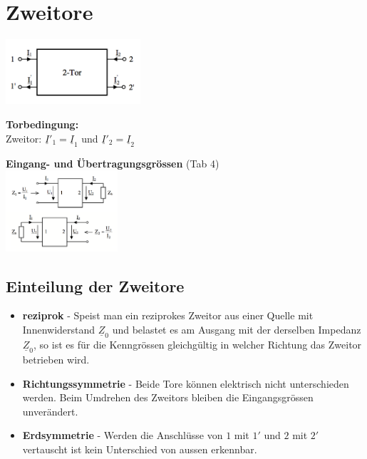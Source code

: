 \section{Zweitore}
	\begin{minipage}{5.5cm}
		\includegraphics[width = 5cm]{./bilder/zweitor}
	\end{minipage}
	\begin{minipage}{5.5cm}
		\textbf{Torbedingung:}\\
		Zweitor: $\underline{I}'_1 = \underline{I}_1$ und $\underline{I}'_2 = \underline{I}_2$
	\end{minipage}
	\begin{minipage}{7.5cm}
		\textbf{Eingang- und Übertragungsgrössen} (Tab 4)\\
		\hspace*{1.5cm}\includegraphics[height = 3cm]{./bilder/Zweitor_EingImp_UebGroe}
	\end{minipage}

\subsection{Einteilung der Zweitore}
	\begin{itemize}
	 \item \textbf{reziprok} - Speist man ein reziprokes Zweitor aus einer Quelle mit Innenwiderstand $\underline{Z}_0$ und belastet es am Ausgang mit der derselben Impedanz $\underline{Z}_0$, so ist es für die Kenngrössen gleichgültig in welcher Richtung das Zweitor betrieben wird.
	 \item \textbf{Richtungssymmetrie} - Beide Tore können elektrisch nicht unterschieden werden. Beim Umdrehen des Zweitors bleiben die Eingangsgrössen unverändert.
	 \item \textbf{Erdsymmetrie} - Werden die Anschlüsse von $1$ mit $1'$ und $2$ mit $2'$ vertauscht ist kein Unterschied von aussen erkennbar.
	\end{itemize}

